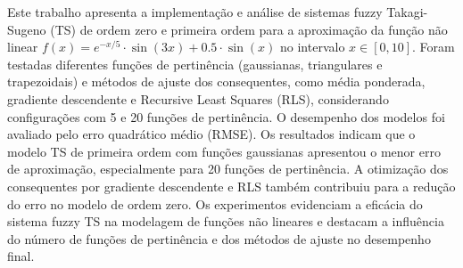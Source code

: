 Este trabalho apresenta a implementação e análise de sistemas fuzzy Takagi-Sugeno (TS) de ordem zero e primeira ordem para a aproximação da função não linear $f(x) = e^{-x/5} \cdot \sin(3x) + 0.5 \cdot \sin(x)$ no intervalo $x \in [0, 10]$. Foram testadas diferentes funções de pertinência (gaussianas, triangulares e trapezoidais) e métodos de ajuste dos consequentes, como média ponderada, gradiente descendente e Recursive Least Squares (RLS), considerando configurações com 5 e 20 funções de pertinência. O desempenho dos modelos foi avaliado pelo erro quadrático médio (RMSE). Os resultados indicam que o modelo TS de primeira ordem com funções gaussianas apresentou o menor erro de aproximação, especialmente para 20 funções de pertinência. A otimização dos consequentes por gradiente descendente e RLS também contribuiu para a redução do erro no modelo de ordem zero. Os experimentos evidenciam a eficácia do sistema fuzzy TS na modelagem de funções não lineares e destacam a influência do número de funções de pertinência e dos métodos de ajuste no desempenho final.